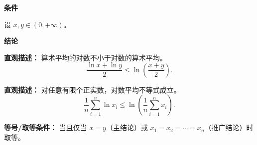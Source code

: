 \begin{statementbox}

\textbf{\textcolor{CStatement}{条件}}
\begin{description}[style=nextline, leftmargin=2.8em, labelsep=0.5em, itemsep=0.35em]
    \item[\textbf{\textcolor{CStatement}{条件 1（正实数）：}}] 设 $x, y \in (0, +\infty)$。
\end{description}

\textbf{\textcolor{CStatement}{结论}}
\begin{description}[style=nextline, leftmargin=2.8em, labelsep=0.5em, itemsep=0.45em]
    \item[\textbf{\textcolor{CStatement}{结论一（对数平均）：}}]
    \textbf{\textcolor{CStatement}{直观描述：}} 算术平均的对数不小于对数的算术平均。
    \[
    \frac{\ln x + \ln y}{2} \leq \ln\!\left( \frac{x+y}{2} \right).
    \]

    \item[\textbf{\textcolor{CStatement}{推广结论（Jensen推广）：}}]
    \textbf{\textcolor{CStatement}{直观描述：}} 对任意有限个正实数，对数平均不等式成立。
    \[
    \frac{1}{n} \sum_{i=1}^{n} \ln x_i \leq \ln\!\left( \frac{1}{n} \sum_{i=1}^{n} x_i \right).
    \]
\end{description}

\textbf{\textcolor{CStatement}{等号/取等条件：}} 当且仅当 $x = y$（主结论）或 $x_1 = x_2 = \cdots = x_n$（推广结论）时取等。

\end{statementbox}
